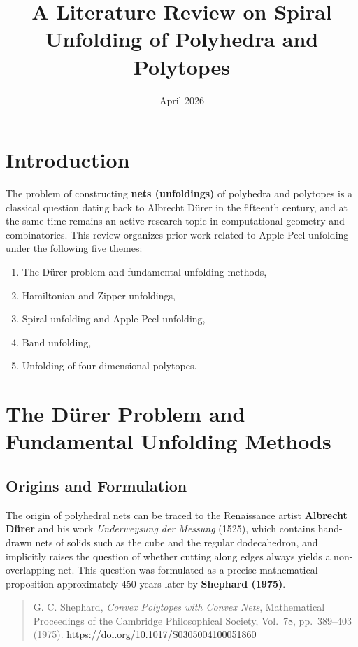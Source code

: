 \documentclass[a4paper,11pt]{article}
\title{A Literature Review on Spiral Unfolding of Polyhedra and Polytopes}
\author{}
\date{April 2026}
\begin{document}
\maketitle
\tableofcontents
\bigskip

\section{Introduction}

The problem of constructing \textbf{nets (unfoldings)} of polyhedra and polytopes is a classical
question dating back to Albrecht D\"{u}rer in the fifteenth century, and at the same time
remains an active research topic in computational geometry and combinatorics.
This review organizes prior work related to Apple-Peel unfolding under the following five themes:
\begin{enumerate}[nosep]
  \item The D\"{u}rer problem and fundamental unfolding methods,
  \item Hamiltonian and Zipper unfoldings,
  \item Spiral unfolding and Apple-Peel unfolding,
  \item Band unfolding,
  \item Unfolding of four-dimensional polytopes.
\end{enumerate}

\section{The D\"{u}rer Problem and Fundamental Unfolding Methods}

\subsection{Origins and Formulation}

The origin of polyhedral nets can be traced to the Renaissance artist \textbf{Albrecht D\"{u}rer}
and his work \textit{Underweysung der Messung} (1525),
which contains hand-drawn nets of solids such as the cube and the regular dodecahedron,
and implicitly raises the question of whether cutting along edges always yields a non-overlapping net.
This question was formulated as a precise mathematical proposition approximately 450 years later
by \textbf{Shephard (1975)}.

\begin{quotation}\noindent
  G. C. Shephard,
  \textit{Convex Polytopes with Convex Nets},
  Mathematical Proceedings of the Cambridge Philosophical Society,
  Vol.~78, pp.~389--403 (1975).
  \url{https://doi.org/10.1017/S0305004100051860}
\end{quotation}
\end{document}
